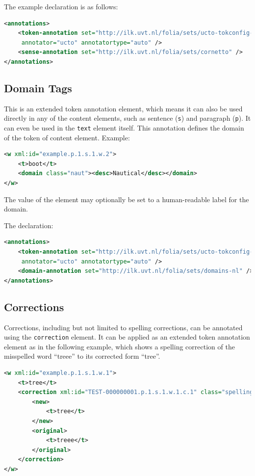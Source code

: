 \documentclass[a4paper,12pt]{report}
\begin{document}
The example declaration is as follows:

\begin{lstlisting}[language=xml]
<annotations>
    <token-annotation set="http://ilk.uvt.nl/folia/sets/ucto-tokconfig-nl"
     annotator="ucto" annotatortype="auto" />
    <sense-annotation set="http://ilk.uvt.nl/folia/sets/cornetto" />
</annotations>
\end{lstlisting}

\subsection{Domain Tags}

This is an extended token annotation element, which means it can also be used directly in any of the content elements, such as sentence (\texttt{s}) and  paragraph (\texttt{p}). It can even be used in the \texttt{text} element itself. This annotation defines the domain of the token of content element. Example:

\begin{lstlisting}[language=xml]
<w xml:id="example.p.1.s.1.w.2">
    <t>boot</t>
    <domain class="naut"><desc>Nautical</desc></domain>
</w>
\end{lstlisting}

The value of the element may optionally be set to a human-readable label for the domain.

The declaration:

\begin{lstlisting}[language=xml]
<annotations>
    <token-annotation set="http://ilk.uvt.nl/folia/sets/ucto-tokconfig-nl"
     annotator="ucto" annotatortype="auto" />
    <domain-annotation set="http://ilk.uvt.nl/folia/sets/domains-nl" />
</annotations>
\end{lstlisting}

\subsection{Corrections}

Corrections, including but not limited to spelling corrections, can be annotated using the \texttt{correction} element. It can be applied as an extended token annotation element as in the following example, which shows a spelling correction of the misspelled word ``treee'' to its corrected form ``tree''.


\begin{lstlisting}[language=xml]
<w xml:id="example.p.1.s.1.w.1">
    <t>tree</t>
    <correction xml:id="TEST-000000001.p.1.s.1.w.1.c.1" class="spelling">
        <new>
            <t>tree</t>
        </new>
        <original>
            <t>treee</t>
        </original>
    </correction>
</w>
\end{lstlisting}
\end{document}
